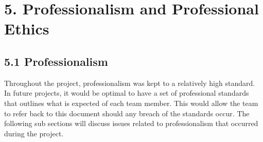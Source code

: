 \documentclass[11pt]{article}
\begin{document}

\section{5. Professionalism and Professional Ethics}

\subsection{5.1 Professionalism}
Throughout the project, professionalism was kept to a relatively high standard. In future projects, it would be optimal to have a set of professional standards that outlines what is 	expected of each team member. This would allow the team to refer back to this document should any breach of the standards occur. The following sub sections will discuss issues related to professionalism that occurred during the project.\\
\end{document}
